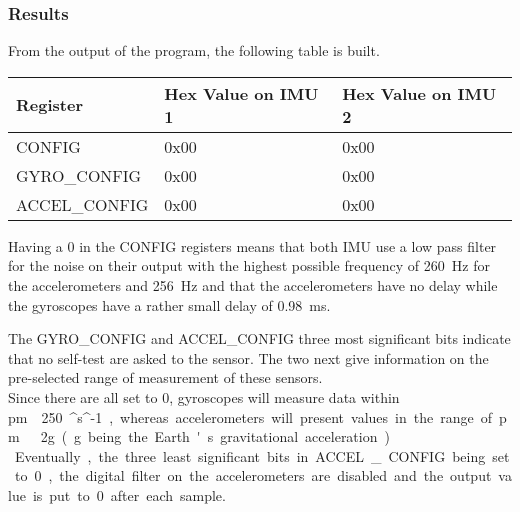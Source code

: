 \subsubsection{Results}
From the output of the program, the following table is built.

\begin{table}[H]
\begin{tabular}{|l|l|l|}
\hline%
  \textbf{Register}       &  \textbf{Hex Value on IMU 1}  & \textbf{Hex Value on IMU 2} \\
\hline%
  CONFIG                  &   0x00                                & 0x00 \\
\hline%
  GYRO\_CONFIG            &   0x00                                & 0x00 \\
\hline%
  ACCEL\_CONFIG           &   0x00                                & 0x00 \\
\hline%
\end{tabular}
\end{table}

Having a 0 in the CONFIG registers means that both IMU use a low pass filter for the noise on their output with the highest possible frequency of \SI{260}{Hz} for the accelerometers and \SI{256}{Hz} and that the accelerometers have no delay while the gyroscopes have a rather small delay of \SI{0,98}{ms}.

The GYRO\_CONFIG and ACCEL\_CONFIG three most significant bits indicate that no self-test are asked to the sensor. The two next give information on the pre-selected range of measurement of these sensors.\\
Since there are all set to 0, gyroscopes will measure data within \si{\pm\ }\SI{250}{^\circ \cdot s^{-1}}, whereas accelerometers will present values in the range of \si{\pm\ 2g} (g being the Earth's gravitational acceleration).\\
Eventually, the three least significant bits in ACCEL\_CONFIG being set to 0, the digital filter on the accelerometers are disabled and the output value is put to 0 after each sample.